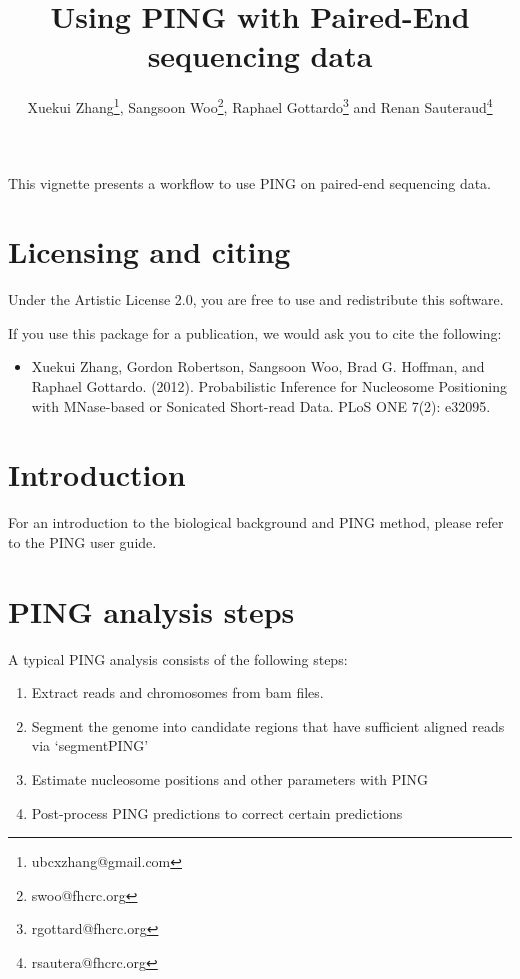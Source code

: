 \documentclass[11pt]{article}
\title{Using PING with Paired-End sequencing data}
\author{Xuekui Zhang\footnote{ubcxzhang@gmail.com}, Sangsoon
Woo\footnote{swoo@fhcrc.org}, Raphael Gottardo\footnote{rgottard@fhcrc.org} and
Renan Sauteraud\footnote{rsautera@fhcrc.org}}
\begin{document}

\maketitle



\textnormal {\normalfont}
This vignette presents a workflow to use PING on paired-end sequencing data.

\tableofcontents
\newpage


\section{Licensing and citing}

Under the Artistic License 2.0, you are free to use and redistribute this software. 

If you use this package for a publication, we would ask you to cite the following: 

\begin{itemize}
\item[] Xuekui Zhang, Gordon Robertson, Sangsoon Woo, Brad G. Hoffman, and Raphael Gottardo. (2012). Probabilistic Inference for Nucleosome Positioning with MNase-based or Sonicated Short-read Data. PLoS ONE 7(2): e32095.
\end{itemize}


\section{Introduction}
For an introduction to the biological background and PING method, please refer to the PING user guide.


\section{PING analysis steps}
A typical PING analysis consists of the following steps:
\begin{enumerate}
  \item Extract reads and chromosomes from bam files.
  \item Segment the genome into candidate regions that have sufficient aligned reads via `segmentPING'
  \item Estimate nucleosome positions and other parameters with PING
  \item Post-process PING predictions to correct certain predictions
\end{enumerate}
\end{document}
